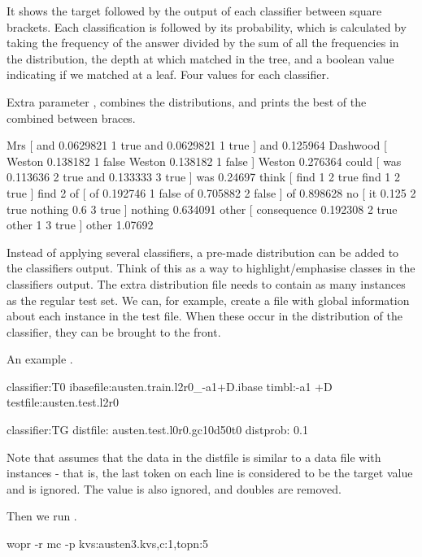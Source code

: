 \documentclass[a4paper,10pt,twoside]{report}
\begin{document}
It shows the target followed by the output of each classifier between
square brackets. Each classification is followed by its probability,
which is calculated by taking the frequency of the answer divided by
the sum of all the frequencies in the distribution, the depth at which
\Timbl{} matched in the tree, and a boolean value indicating if we
matched at a leaf. Four values for each classifier.

\par
Extra parameter , combines the distributions, and prints the
best of the combined between braces.

\begin{wout}{}
Mrs [ and 0.0629821 1 true and 0.0629821 1 true ] { and 0.125964 }
Dashwood [ Weston 0.138182 1 false Weston 0.138182 1 false ] { Weston 0.276364 }
could [ was 0.113636 2 true and 0.133333 3 true ] { was 0.24697 }
think [ find 1 2 true find 1 2 true ] { find 2 }
of [ of 0.192746 1 false of 0.705882 2 false ] { of 0.898628 }
no [ it 0.125 2 true nothing 0.6 3 true ] { nothing 0.634091 }
other [ consequence 0.192308 2 true other 1 3 true ] { other 1.07692 }
\end{wout}

Instead of applying several classifiers, a pre-made distribution can
be added to the classifiers output. Think of this as a way to
highlight/emphasise classes in the classifiers output. The extra
distribution file needs to contain as many instances as the regular
test set. We can, for example, create a file with global information
about each instance in the test file. When these occur in the
distribution of the classifier, they can be brought to the front.

An example .

\begin{wout}{}%
classifier:T0
ibasefile:austen.train.l2r0_-a1+D.ibase
timbl:-a1 +D
testfile:austen.test.l2r0

classifier:TG
distfile: austen.test.l0r0.gc10d50t0
distprob: 0.1
\end{wout}

Note that \wopr{} assumes that the data in the distfile is similar to a
data file with instances - that is, the last token on each line is
considered to be the target value and is ignored. The \cmp{\_} value is also
ignored, and doubles are removed.

Then we run \wopr{}.

\begin{bash}{}
wopr -r mc -p kvs:austen3.kvs,c:1,topn:5
\end{bash}
\end{document}
